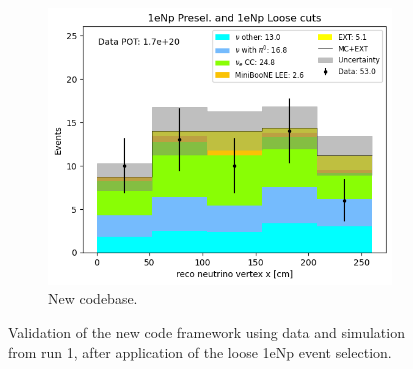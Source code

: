 \begin{figure}[H]
\begin{subfigure}[t]{0.32\linewidth}
        \includegraphics[width=\linewidth]{technote/Appendix_Validation/Figures/1eNp_Loose/Run1_Vertex_X_Alex.png}
        \caption{New codebase.}
    \end{subfigure}
    \caption{Validation of the new code framework using data and simulation from run 1, after application of the loose 1eNp event selection.}
\end{figure}

